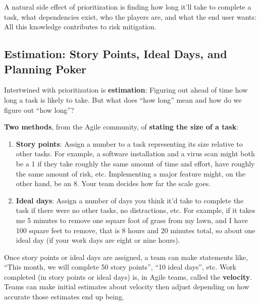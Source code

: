 A natural side effect of prioritization is finding how long it'll take to complete a task, what dependencies exist, who the players are, and what the end user wants: All this knowledge contributes to risk mitigation.

\subsection{Estimation: Story Points, Ideal Days, and Planning Poker}
Intertwined with prioritization is \textbf{estimation}: Figuring out ahead of time how long a task is likely to take. But what does ``how long'' mean and how do we figure out ``how long''?

\textbf{Two methods}, from the Agile community, of \textbf{stating the size of a task}:

\begin{enumerate}
\item \textbf{Story points}: Assign a number to a task representing its size relative to other tasks. For example, a software installation and a virus scan might both be a 1 if they take roughly the same amount of time and effort, have roughly the same amount of risk, etc. Implementing a major feature might, on the other hand, be an 8. Your team decides how far the scale goes.\marginpar{\idealDaysDef}
\item \textbf{Ideal days}: Assign a number of days you think it'd take to complete the task if there were no other tasks, no distractions, etc. For example, if it takes me 5 minutes to remove one square foot of grass from my lawn, and I have 100 square feet to remove, that is 8 hours and 20 minutes total, so about one ideal day (if your work days are eight or nine hours).
\end{enumerate}

Once story points or ideal days are assigned, a team can make statements like, ``This month, we will complete 50 story points'', ``10 ideal days'', etc. Work completed (in story points or ideal days) is, in Agile teams, called the \textbf{velocity}\marginpar{\velocityDef\margindivider}. Teams can make initial estimates about velocity then adjust depending on how accurate those estimates end up being.

